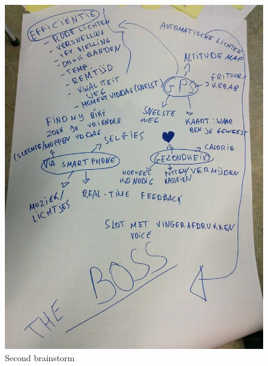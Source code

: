 \begin{figure}[H]
\center
 \includegraphics[width=\linewidth]{attachments/brainstorm/brainstorm2.jpg}
 \caption{Second brainstorm}
 \label{image:ganttchart2}
\end{figure} 
